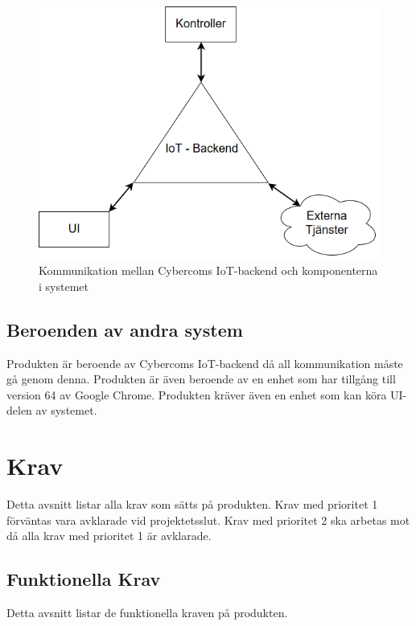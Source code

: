 \documentclass[10pt]{article}
\begin{document}
	\begin{figure}[h]
		\centering
		\includegraphics[scale=0.4]{backend}
		\caption{Kommunikation mellan Cybercoms IoT-backend och komponenterna i systemet}
		\label{fig:backend}
	\end{figure}
	
	
	\subsection{Beroenden av andra system}
	Produkten är beroende av Cybercoms IoT-backend då all kommunikation måste gå genom denna. Produkten är även beroende av en enhet som har tillgång till version 64 av Google Chrome. Produkten kräver även en enhet som kan köra UI-delen av systemet.

\pagebreak
\section{Krav}
	Detta avsnitt listar alla krav som sätts på produkten. Krav med prioritet 1 förväntas vara avklarade vid projektetsslut. Krav med prioritet 2 ska arbetas mot då alla krav med prioritet 1 är avklarade.
	\subsection{Funktionella Krav}
	Detta avsnitt listar de funktionella kraven på produkten.	
	
\end{document}
